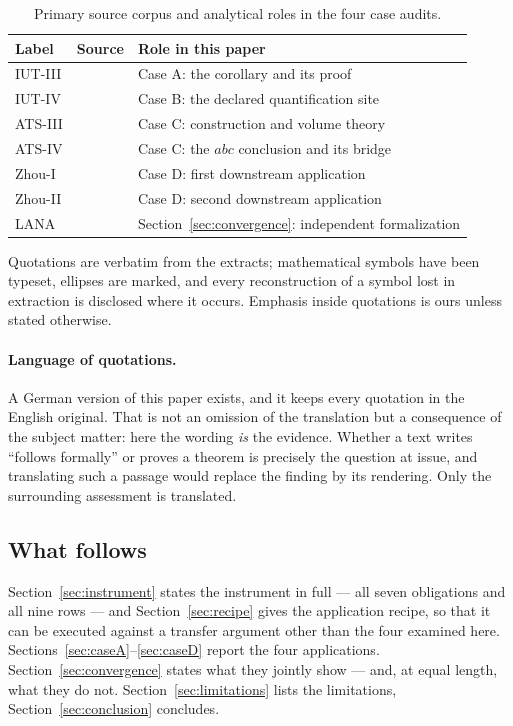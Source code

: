 \documentclass[11pt,a4paper]{article}
\theoremstyle{definition}
\begin{document}
\begin{table}[htbp]
\centering
\small
\renewcommand{\arraystretch}{1.12}
\begin{tabular}{@{}lll@{}}
\toprule
Label & Source & Role in this paper \\
\midrule
IUT-III & \cite{Mochizuki2021c} & Case A: the corollary and its proof \\
IUT-IV & \cite{Mochizuki2021d} & Case B: the declared quantification site \\
ATS-III & \cite{JoshiATSIII} & Case C: construction and volume theory \\
ATS-IV & \cite{JoshiATSIV} & Case C: the $abc$ conclusion and its bridge \\
Zhou-I & \cite{ZhouI} & Case D: first downstream application \\
Zhou-II & \cite{ZhouII} & Case D: second downstream application \\
LANA & \cite{LANA2026} & Section~\ref{sec:convergence}: independent formalization \\
\bottomrule
\end{tabular}
\caption{Primary source corpus and analytical roles in the four case audits.}
\label{tab:primary_sources}
\end{table}

Quotations are verbatim from the extracts; mathematical symbols have been
typeset, ellipses are marked, and every reconstruction of a symbol lost in
extraction is disclosed where it occurs. Emphasis inside quotations is ours
unless stated otherwise.

\paragraph{Language of quotations.} A German version of this paper exists, and it
keeps every quotation in the English original. That is not an omission of the
translation but a consequence of the subject matter: here the wording \emph{is}
the evidence. Whether a text writes ``follows formally'' or proves a theorem is
precisely the question at issue, and translating such a passage would replace the
finding by its rendering. Only the surrounding assessment is translated.

\subsection{What follows}

Section~\ref{sec:instrument} states the instrument in full --- all seven
obligations and all nine rows --- and Section~\ref{sec:recipe} gives the
application recipe, so that it can be executed against a transfer argument other
than the four examined here.
Sections~\ref{sec:caseA}--\ref{sec:caseD} report the four applications.
Section~\ref{sec:convergence} states what they jointly show --- and, at equal
length, what they do not. Section~\ref{sec:limitations} lists the limitations,
Section~\ref{sec:conclusion} concludes.
\end{document}
